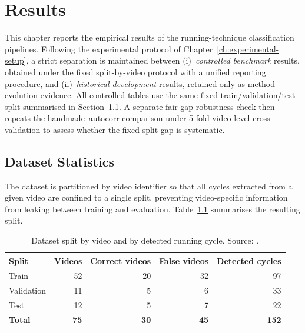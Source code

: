 
\chapter{Results}
\label{ch:results}

This chapter reports the empirical results of the running-technique
classification pipelines. Following the experimental protocol of
Chapter~\ref{ch:experimental-setup}, a strict separation is maintained
between (i)~\emph{controlled benchmark} results, obtained under the fixed
split-by-video protocol with a unified reporting procedure, and
(ii)~\emph{historical development} results, retained only as method-evolution
evidence. All controlled tables use the same fixed train/validation/test
split summarised in Section~\ref{sec:dataset-stats}. A separate fair-gap
robustness check then repeats the handmade--autocorr comparison under
5-fold video-level cross-validation to assess whether the fixed-split gap is
systematic.

\section{Dataset Statistics}
\label{sec:dataset-stats}

The dataset is partitioned by video identifier so that all cycles extracted
from a given video are confined to a single split, preventing video-specific
information from leaking between training and evaluation. Table~\ref{tab:split}
summarises the resulting split.

\begin{table}[htbp]
\centering
\caption[Dataset split by video and by detected running cycle. Source: \protect{}.]{Dataset split by video and by detected running cycle. Source: .}
\label{tab:split}
\tablefont
\begin{tabularx}{\textwidth}{X r r r r}
\toprule
\textbf{Split} & \textbf{Videos} & \textbf{Correct videos} & \textbf{False videos} & \textbf{Detected cycles} \\
\midrule
Train       & 52 & 20 & 32 & 97  \\
Validation  & 11 &  5 &  6 & 33  \\
Test        & 12 &  5 &  7 & 22  \\
\midrule
\textbf{Total} & \textbf{75} & \textbf{30} & \textbf{45} & \textbf{152} \\
\bottomrule
\end{tabularx}
\end{table}

